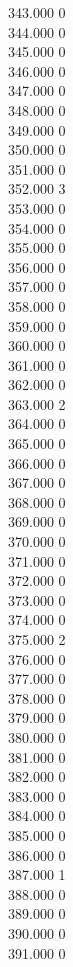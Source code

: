 { 343.000	0 \\
 344.000	0 \\
 345.000	0 \\
 346.000	0 \\
 347.000	0 \\
 348.000	0 \\
 349.000	0 \\
 350.000	0 \\
 351.000	0 \\
 352.000	3 \\
 353.000	0 \\
 354.000	0 \\
 355.000	0 \\
 356.000	0 \\
 357.000	0 \\
 358.000	0 \\
 359.000	0 \\
 360.000	0 \\
 361.000	0 \\
 362.000	0 \\
 363.000	2 \\
 364.000	0 \\
 365.000	0 \\
 366.000	0 \\
 367.000	0 \\
 368.000	0 \\
 369.000	0 \\
 370.000	0 \\
 371.000	0 \\
 372.000	0 \\
 373.000	0 \\
 374.000	0 \\
 375.000	2 \\
 376.000	0 \\
 377.000	0 \\
 378.000	0 \\
 379.000	0 \\
 380.000	0 \\
 381.000	0 \\
 382.000	0 \\
 383.000	0 \\
 384.000	0 \\
 385.000	0 \\
 386.000	0 \\
 387.000	1 \\
 388.000	0 \\
 389.000	0 \\
 390.000	0 \\
 391.000	0 \\
}
